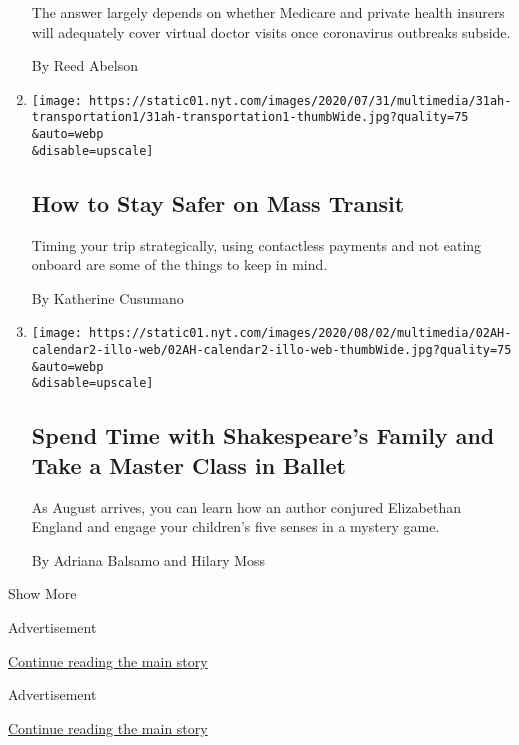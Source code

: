 \begin{enumerate}
  The answer largely depends on whether Medicare and private health
  insurers will adequately cover virtual doctor visits once coronavirus
  outbreaks subside.

  By Reed Abelson
\item
  \href{/2020/08/01/at-home/coronavirus-public-transportation-subway.html}{}

  \texttt{[image: https://static01.nyt.com/images/2020/07/31/multimedia/31ah-transportation1/31ah-transportation1-thumbWide.jpg?quality=75\\\&auto=webp\\\&disable=upscale]}

  \hypertarget{how-to-stay-safer-on-mass-transit}{%
  \subsection{How to Stay Safer on Mass
  Transit}\label{how-to-stay-safer-on-mass-transit}}

  Timing your trip strategically, using contactless payments and not
  eating onboard are some of the things to keep in mind.

  By Katherine Cusumano
\item
  \href{/2020/08/01/at-home/coronavirus-things-to-do-this-week.html}{}

  \texttt{[image: https://static01.nyt.com/images/2020/08/02/multimedia/02AH-calendar2-illo-web/02AH-calendar2-illo-web-thumbWide.jpg?quality=75\\\&auto=webp\\\&disable=upscale]}

  \hypertarget{spend-time-with-shakespeares-family-and-take-a-master-class-in-ballet}{%
  \subsection{Spend Time with Shakespeare's Family and Take a Master
  Class in
  Ballet}\label{spend-time-with-shakespeares-family-and-take-a-master-class-in-ballet}}

  As August arrives, you can learn how an author conjured Elizabethan
  England and engage your children's five senses in a mystery game.

  By Adriana Balsamo and Hilary Moss
\end{enumerate}

Show More

Advertisement

\protect\hyperlink{after-mid4}{Continue reading the main story}

Advertisement

\protect\hyperlink{after-mktg}{Continue reading the main story}

